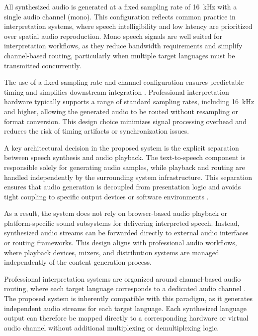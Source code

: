 All synthesized audio is generated at a fixed sampling rate of 16~kHz with a single audio channel (mono). This configuration reflects common practice in interpretation systems, where speech intelligibility and low latency are prioritized over spatial audio reproduction. Mono speech signals are well suited for interpretation workflows, as they reduce bandwidth requirements and simplify channel-based routing, particularly when multiple target languages must be transmitted concurrently.

The use of a fixed sampling rate and channel configuration ensures predictable timing and simplifies downstream integration \cite{wang2017realtimeaudio}. Professional interpretation hardware typically supports a range of standard sampling rates, including 16~kHz and higher, allowing the generated audio to be routed without resampling or format conversion. This design choice minimizes signal processing overhead and reduces the risk of timing artifacts or synchronization issues.


A key architectural decision in the proposed system is the explicit separation between speech synthesis and audio playback. The text-to-speech component is responsible solely for generating audio samples, while playback and routing are handled independently by the surrounding system infrastructure. This separation ensures that audio generation is decoupled from presentation logic and avoids tight coupling to specific output devices or software environments \cite{Aminzadeh2009Advocate}.

As a result, the system does not rely on browser-based audio playback or platform-specific sound subsystems for delivering interpreted speech. Instead, synthesized audio streams can be forwarded directly to external audio interfaces or routing frameworks. This design aligns with professional audio workflows, where playback devices, mixers, and distribution systems are managed independently of the content generation process.


Professional interpretation systems are organized around channel-based audio routing, where each target language corresponds to a dedicated audio channel \cite{rayaa2022remoteSI}. The proposed system is inherently compatible with this paradigm, as it generates independent audio streams for each target language. Each synthesized language output can therefore be mapped directly to a corresponding hardware or virtual audio channel without additional multiplexing or demultiplexing logic.

